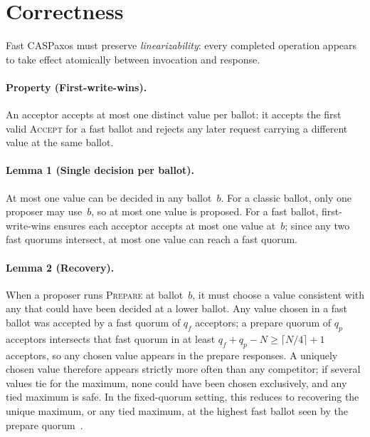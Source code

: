 \section{Correctness}
\label{sec:correctness}

Fast CASPaxos must preserve \emph{linearizability}: every completed operation appears to take effect atomically between invocation and response.

\paragraph{Property (First-write-wins).}
An acceptor accepts at most one distinct value per ballot: it accepts the first valid \textsc{Accept} for a fast ballot and rejects any later request carrying a different value at the same ballot.

\paragraph{Lemma 1 (Single decision per ballot).}
At most one value can be decided in any ballot~$b$.
For a classic ballot, only one proposer may use~$b$, so at most one value is proposed.
For a fast ballot, first-write-wins ensures each acceptor accepts at most one value at~$b$; since any two fast quorums intersect, at most one value can reach a fast quorum.

\paragraph{Lemma 2 (Recovery).}
When a proposer runs \textsc{Prepare} at ballot~$b$, it must choose a value consistent with any that could have been decided at a lower ballot.
Any value chosen in a fast ballot was accepted by a fast quorum of $q_f$ acceptors; a prepare quorum of $q_p$ acceptors intersects that fast quorum in at least $q_f + q_p - N \geq \lceil N/4 \rceil + 1$ acceptors, so any chosen value appears in the prepare responses.
A uniquely chosen value therefore appears strictly more often than any competitor; if several values tie for the maximum, none could have been chosen exclusively, and any tied maximum is safe.
In the fixed-quorum setting, this reduces to recovering the unique maximum, or any tied maximum, at the highest fast ballot seen by the prepare quorum~\cite{howard_tr19,howard_arxiv19}.


